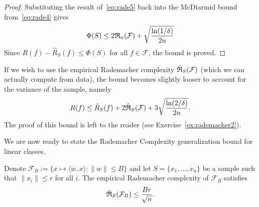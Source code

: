 \begin{proof}
Substituting the result of~\eqref{eq:rade5} back into the McDiarmid bound from~\eqref{eq:rade4} gives
$$\Phi(S) \leq 2\mathfrak{R}_n(\mathcal{F}) + \sqrt{\frac{\ln(1/\delta)}{2n}}$$
Since $R(f) - \hat{R}_S(f) \leq \Phi(S)$ for all $f \in \mathcal{F}$, the bound is proved. 

\end{proof}

If we wish to use the empirical Rademacher complexity $\hat{\mathfrak{R}}_S(\mathcal{F})$ (which we can actually compute from data), the bound becomes slightly looser to account for the variance of the sample, namely
\begin{equation}\label{eq:radebound2}
R(f) \leq \hat{R}_S(f) + 2\hat{\mathfrak{R}}_S(\mathcal{F}) + 3\sqrt{\frac{\ln(2/\delta)}{2n}}.
\end{equation}
The proof of this bound is left to the reader (see Exercise~\ref{ex:rademacher2}).

\medskip

We are now ready to state the Rademacher Complexity  generalization bound for linear classes.

\begin{theorem}\label{th:rademacher_linear}
Denote $\mathcal{F}_B := \{x \mapsto \langle w, x \rangle : \|w\|\leq B\}$ and let $S = \{x_1, \dots, x_n\}$ be a sample such that $\|x_i\| \leq r$ for all $i$. The empirical Rademacher complexity of $\mathcal{F}_B$ satisfies
$$\hat{\mathfrak{R}}_S(\mathcal{F}_B) \leq \frac{Br}{\sqrt{n}}.$$
\end{theorem}

